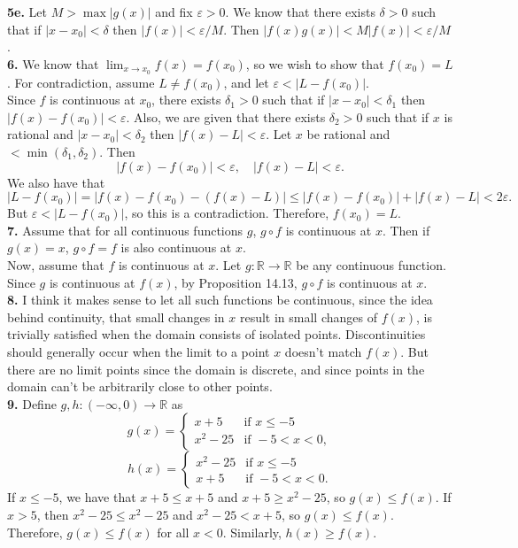 \documentclass{article}
\newcommand{\R}{\mathbb{R}}
\newcommand{\eps}{\varepsilon}
\begin{document}
\textbf{5e.} Let $M > \max|g(x)|$ and fix $\eps > 0$. We know that there exists $\delta > 0$ such that if $|x - x_0| < \delta$ then $|f(x)| < \eps/M$. Then $|f(x)g(x)| < M|f(x)| < \eps/M$. \\

\textbf{6.} We know that $\lim_{x \to x_0} f(x) = f(x_0)$, so we wish to show that $f(x_0) = L$. For contradiction, assume $L \neq f(x_0)$, and let $\eps < |L - f(x_0)|$. \\

Since $f$ is continuous at $x_0$, there exists $\delta_1 > 0$ such that if $|x - x_0| < \delta_1$ then $|f(x) - f(x_0)| < \eps$. Also, we are given that there exists $\delta_2 > 0$ such that if $x$ is rational and $|x - x_0| < \delta_2$ then $|f(x) - L| < \eps$. Let $x$ be rational and $< \min(\delta_1, \delta_2)$. Then
$$|f(x) - f(x_0)| < \eps, \quad |f(x) - L| < \eps.$$
We also have that
$$|L - f(x_0)| = |f(x) - f(x_0) - (f(x) - L)| \le |f(x) - f(x_0)| + |f(x) - L| < 2\eps.$$
But $\eps < |L - f(x_0)|$, so this is a contradiction. Therefore, $f(x_0) = L$. \\

\textbf{7.} Assume that for all continuous functions $g$, $g \circ f$ is continuous at $x$. Then if $g(x) = x$, $g\circ f = f$ is also continuous at $x$. \\

Now, assume that $f$ is continuous at $x$. Let $g: \R \to \R$ be any continuous function. Since $g$ is continuous at $f(x)$, by Proposition 14.13, $g \circ f$ is continuous at $x$. \\

\textbf{8.} I think it makes sense to let all such functions be continuous, since the idea behind continuity, that small changes in $x$ result in small changes of $f(x)$, is trivially satisfied when the domain consists of isolated points. Discontinuities should generally occur when the limit to a point $x$ doesn't match $f(x)$. But there are no limit points since the domain is discrete, and since points in the domain can't be arbitrarily close to other points. \\

\textbf{9.} Define $g, h: (-\infty, 0) \to \R$ as
$$g(x) = \begin{cases}
      x + 5 & \text{if } x \le -5 \\
      x^2 - 25 & \text{if } -5 < x < 0,
   \end{cases}$$
$$h(x) = \begin{cases}
      x^2 - 25 & \text{if } x \le -5 \\
      x + 5 & \text{if } -5 < x < 0.
   \end{cases}$$
If $x \le -5$, we have that $x + 5 \le x + 5$ and $x + 5 \ge x^2 - 25$, so $g(x) \le f(x)$. If $x > 5$, then $x^2 - 25 \le x^2 - 25$ and $x^2 - 25 < x + 5$, so $g(x) \le f(x)$. Therefore, $g(x) \le f(x)$ for all $x < 0$. Similarly, $h(x) \ge f(x)$. \\
\end{document}
